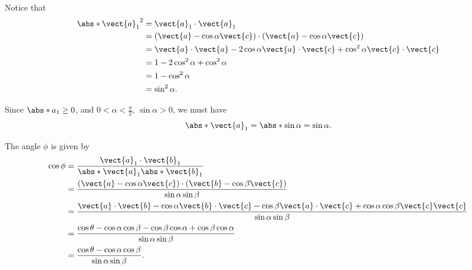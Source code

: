 \begin{enumerate}
          Notice that
          \begin{align*}
              \abs*{\vect{a}_1}^2 & = \vect{a}_1 \cdot \vect{a}_1                                                                             \\
                                  & = \left(\vect{a} - \cos \alpha \vect{c}\right) \cdot \left(\vect{a} - \cos \alpha \vect{c}\right)         \\
                                  & = \vect{a} \cdot \vect{a} - 2 \cos \alpha \vect{a} \cdot \vect{c} + \cos^2 \alpha \vect{c} \cdot \vect{c} \\
                                  & = 1 - 2 \cos^2 \alpha + \cos^2 \alpha                                                                     \\
                                  & = 1 - \cos^2 \alpha                                                                                       \\
                                  & = \sin^2 \alpha.
          \end{align*}

          Since \(\abs*{a_1} \geq 0\), and \(0 < \alpha < \frac{\pi}{2}\), \(\sin \alpha > 0\), we must have
          \[
              \abs*{\vect{a}_1} = \abs*{\sin \alpha} = \sin \alpha.
          \]

          The angle \(\phi\) is given by
          \begin{align*}
              \cos \phi & = \frac{\vect{a}_1 \cdot \vect{b}_1}{\abs*{\vect{a}_1} \abs*{\vect{b}_1}}                                                                                                      \\
                        & =  \frac{\left(\vect{a} - \cos \alpha \vect{c}\right) \cdot \left(\vect{b} - \cos \beta \vect{c}\right)}{\sin \alpha \sin \beta}                                               \\
                        & = \frac{\vect{a} \cdot \vect{b} - \cos \alpha \vect{b} \cdot \vect{c} - \cos \beta \vect{a} \cdot \vect{c} + \cos \alpha \cos \beta \vect{c} \vect{c}}{\sin \alpha \sin \beta} \\
                        & = \frac{\cos \theta - \cos \alpha \cos \beta - \cos \beta \cos \alpha + \cos \beta \cos \alpha}{\sin \alpha \sin \beta}                                                        \\
                        & = \frac{\cos \theta - \cos \alpha \cos \beta}{\sin \alpha \sin \beta}.
          \end{align*}


\end{enumerate}
